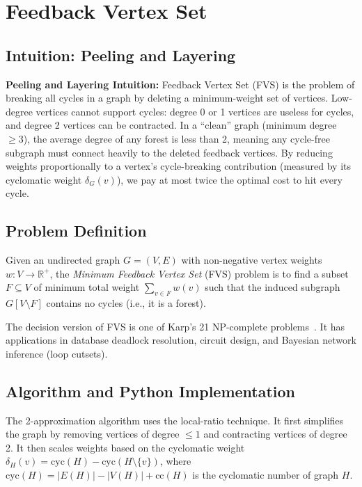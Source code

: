 \chapter{Feedback Vertex Set}
\label{ch:fvs}

\section{Intuition: Peeling and Layering}

\begin{intuitionbox}
\textbf{Peeling and Layering Intuition:} Feedback Vertex Set (FVS) is the problem of breaking all cycles in a graph by deleting a minimum-weight set of vertices. Low-degree vertices cannot support cycles: degree 0 or 1 vertices are useless for cycles, and degree 2 vertices can be contracted. In a ``clean'' graph (minimum degree $\ge 3$), the average degree of any forest is less than 2, meaning any cycle-free subgraph must connect heavily to the deleted feedback vertices. By reducing weights proportionally to a vertex's cycle-breaking contribution (measured by its cyclomatic weight $\delta_G(v)$), we pay at most twice the optimal cost to hit every cycle.
\end{intuitionbox}

\section{Problem Definition}
Given an undirected graph $G = (V, E)$ with non-negative vertex weights $w: V \to \mathbb{R}^+$, the \emph{Minimum Feedback Vertex Set} (FVS) problem is to find a subset $F \subseteq V$ of minimum total weight $\sum_{v \in F} w(v)$ such that the induced subgraph $G[V \setminus F]$ contains no cycles (i.e., it is a forest).

The decision version of FVS is one of Karp's 21 NP-complete problems~\cite{karp72}. It has applications in database deadlock resolution, circuit design, and Bayesian network inference (loop cutsets).

\section{Algorithm and Python Implementation}
The 2-approximation algorithm uses the local-ratio technique. It first simplifies the graph by removing vertices of degree $\le 1$ and contracting vertices of degree 2. It then scales weights based on the cyclomatic weight $\delta_H(v) = \text{cyc}(H) - \text{cyc}(H \setminus \{v\})$, where $\text{cyc}(H) = |E(H)| - |V(H)| + \text{cc}(H)$ is the cyclomatic number of graph $H$.

